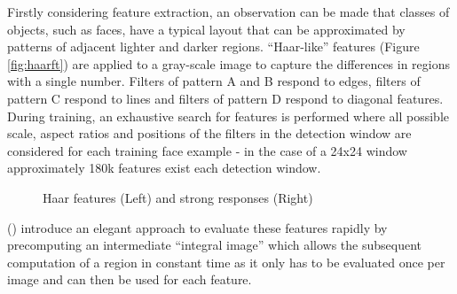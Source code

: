 \documentclass[a4paper,twoside,12pt]{report}
\begin{document}
Firstly considering feature extraction, an observation can be made that classes of objects, such as faces, have a typical layout that can be approximated by patterns of adjacent lighter and darker regions. ``Haar-like'' features (Figure \ref{fig:haarft}) are applied to a gray-scale image to capture the differences in regions with a single number. Filters of pattern A and B respond to edges, filters of pattern C respond to lines and filters of pattern D respond to diagonal features. During training, an exhaustive search for features is performed where all possible scale, aspect ratios and positions of the filters in the detection window are considered for each training face example - in the case of a 24x24 window approximately 180k features exist each detection window. 

\begin{figure}[h!]
    \centering
    \qquad
    \caption{Haar features \cite{vjdet} (Left) and strong responses (Right)}
\end{figure}

\citeauthor{vjdet} (\citeyear{vjdet}) introduce an elegant approach to evaluate these features rapidly by precomputing an intermediate ``integral image'' which allows the subsequent computation of a region in constant time as it only has to be evaluated once per image and can then be used for each feature.
\end{document}
